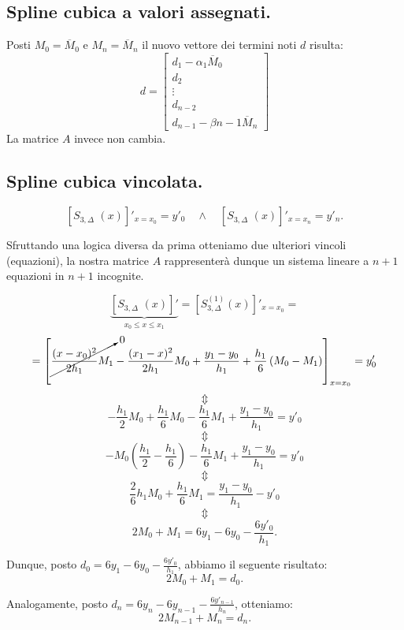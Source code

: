\subsection{Spline cubica a valori assegnati.}
Posti $M_0 = \overline{M}_0$ e $M_n = \overline{M}_n$ il nuovo vettore dei
termini noti $d$ risulta:
\[
d = \left[\begin{array}{l}
d_1 -  \alpha_1\overline{M}_0\\
d_2 \\
\vdots \\
d_{n-2}\\
d_{n-1} - \beta{n-1}\overline{M}_n
\end{array}
\right]
\]
La matrice $A$ invece non cambia.

\subsection{Spline cubica vincolata.}
\[
\left[S_{3,\Delta}^{\phantom{(1)}}(x) \right]'_{x = x_0}= y'_0 
\quad \wedge \quad  \left[S_{3,\Delta}^{\phantom{(1)}}(x) \right]'_{x = x_n} = y'_n.
\]

Sfruttando una logica diversa da prima
otteniamo due ulteriori vincoli (equazioni), la nostra matrice $A$ 
rappresenterà dunque un sistema lineare a $n+1$ equazioni in $n+1$ incognite.

\[
\underbrace{\left[S_{3,\Delta}^{\phantom{(1)}}(x) \right]'}
_{ x_0 \leq x \leq x_1} = \left[S_{3,\Delta}^{(1)}(x) \right]'_{x = x_0} =
\]
\[=
\left[
\cancelto{0}{\frac{(x-x_{0})^2}{2h_1}M_1} 
- \frac{(x_1-x)^2}{2h_1}M_{0} + \frac{y_{1} -y_{0}}{h_1} + 
\frac{h_1}{6}\left(M_{0}-M_1\right) \right]_{x = x_0}
= y'_0 
\]
\[\Updownarrow\]
\[
- \frac{h_1}{2}M_0 + \frac{h_1}{6}M_0 - \frac{h_1}{6}M_1 
+ \frac{y_{1} -y_{0}}{h_1} = y'_0 
\]
\[\Updownarrow\]
\[
- M_0\left(\frac{h_1}{2}-\frac{h_1}{6} \right) - \frac{h_1}{6}M_1 
+ \frac{y_{1} -y_{0}}{h_1} = y'_0 
\]
\[\Updownarrow\]
\[
\frac{2}{6}h_1M_0 + \frac{h_1}{6}M_1  = \frac{y_{1} -y_{0}}{h_1} -y'_0 
\]
\[\Updownarrow\]
\[
2 M_0 + M_1 = 6y_1 -6y_0 - \frac{6 y'_0}{h_1}.
\]

Dunque, posto $d_0 = 6y_1 -6y_0 - \frac{6 y'_0}{h_1}$, abbiamo il seguente
risultato:
\[2 M_0 + M_1 = d_0.
\]

Analogamente, posto $d_n = 6y_{n} - 6y_{n-1} - \frac{6 y'_{n-1}}{h_n}$, 
otteniamo:
\[2 M_{n-1} + M_n = d_n.\]

